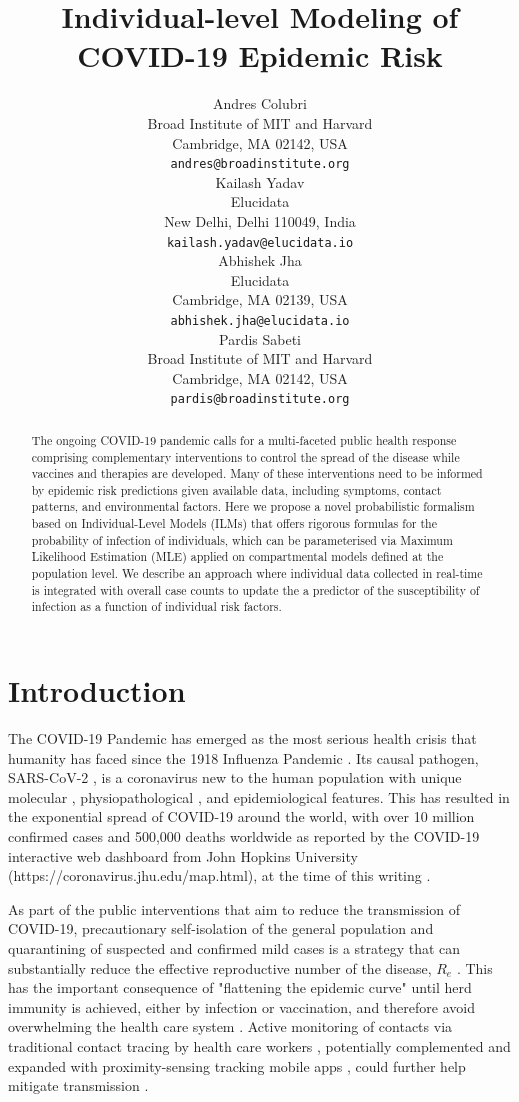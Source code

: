 \documentclass{article}
\title{Individual-level Modeling of COVID-19 Epidemic Risk}
\author{
 Andres Colubri \\
  Broad Institute of MIT and Harvard\\
  Cambridge, MA 02142, USA \\
  \texttt{andres@broadinstitute.org} \\
  \And
 Kailash Yadav \\
  Elucidata\\
  New Delhi, Delhi 110049, India \\
  \texttt{kailash.yadav@elucidata.io} \\
  \And  
 Abhishek Jha \\
  Elucidata\\
  Cambridge, MA 02139, USA \\
  \texttt{abhishek.jha@elucidata.io} \\  
   \And
   Pardis Sabeti \\
   Broad Institute of MIT and Harvard\\
   Cambridge, MA 02142, USA \\
   \texttt{pardis@broadinstitute.org} \\
}
\begin{document}
\maketitle

\begin{abstract}
The ongoing COVID-19 pandemic calls for a multi-faceted public health response comprising complementary interventions to control the spread of the disease while vaccines and therapies are developed. Many of these interventions need to be informed by epidemic risk predictions given available data, including symptoms, contact patterns, and environmental factors. Here we propose a novel probabilistic formalism based on Individual-Level Models (ILMs) that offers rigorous formulas for the probability of infection of individuals, which can be parameterised via Maximum Likelihood Estimation (MLE) applied on compartmental models defined at the population level. We describe an approach where individual data collected in real-time is integrated with overall case counts to update the a predictor of the susceptibility of infection as a function of individual risk factors.
\end{abstract}




\section{Introduction}
The COVID-19 Pandemic \cite{Velavan2020, Fauci2020} has emerged as the most serious health crisis that humanity has faced since the 1918 Influenza Pandemic \cite{Viboud2018}. Its causal pathogen, SARS-CoV-2 \cite{Lu2020}, is a coronavirus new to the human population with unique molecular \cite{Wrapp2020}, physiopathological \cite{Zou2020}, and epidemiological \cite{Liu2020} features. This has resulted in the exponential spread of COVID-19 around the world, with over 10 million confirmed cases and 500,000 deaths worldwide as reported by the COVID-19 interactive web dashboard from John Hopkins University (https://coronavirus.jhu.edu/map.html), at the time of this writing \cite{Dong2020}.

As part of the public interventions that aim to reduce the transmission of COVID-19, precautionary self-isolation of the general population and quarantining of suspected and confirmed mild cases is a strategy that can substantially reduce the effective reproductive number of the disease, $R_e$ \cite{Wang2020}. This has the important consequence of "flattening the epidemic curve" until herd immunity is achieved, either by infection or vaccination, and therefore avoid overwhelming the health care system \cite{Kissler2020}. Active monitoring of contacts via traditional contact tracing by health care workers \cite{eames2003}, potentially complemented and expanded with proximity-sensing tracking mobile apps \cite{Ferretti2020}, could further help mitigate transmission \cite{Peak2020}.
\end{document}
